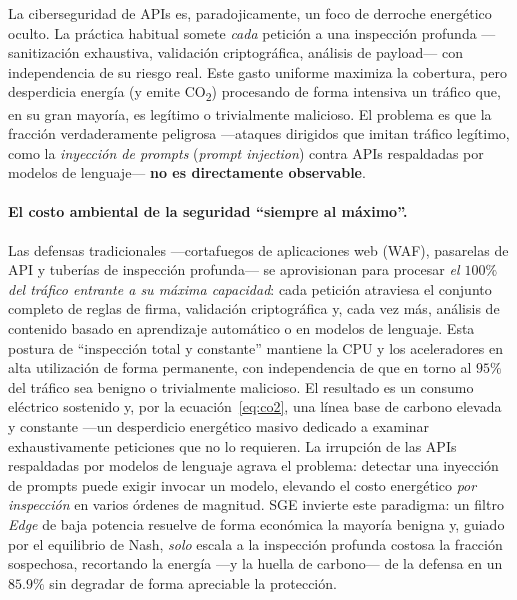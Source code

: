 \documentclass[10pt,twocolumn]{article}
\begin{document}
La ciberseguridad de APIs es, paradojicamente, un foco de derroche energ\'etico
oculto. La pr\'actica habitual somete \emph{cada} petici\'on a una inspecci\'on
profunda ---sanitizaci\'on exhaustiva, validaci\'on criptogr\'afica, an\'alisis de
payload--- con independencia de su riesgo real. Este gasto uniforme maximiza la
cobertura, pero desperdicia energ\'ia (y emite CO\textsubscript{2}) procesando de
forma intensiva un tr\'afico que, en su gran mayor\'ia, es leg\'itimo o trivialmente
malicioso. El problema es que la fracci\'on verdaderamente peligrosa ---ataques
dirigidos que imitan tr\'afico leg\'itimo, como la \emph{inyecci\'on de prompts}
(\emph{prompt injection}) contra APIs respaldadas por modelos de lenguaje--- \textbf{no
es directamente observable}.

\paragraph{El costo ambiental de la seguridad ``siempre al m\'aximo''.} Las defensas
tradicionales ---cortafuegos de aplicaciones web (WAF), pasarelas de API y tuber\'ias
de inspecci\'on profunda--- se aprovisionan para procesar \emph{el $100\%$ del
tr\'afico entrante a su m\'axima capacidad}: cada petici\'on atraviesa el conjunto
completo de reglas de firma, validaci\'on criptogr\'afica y, cada vez m\'as, an\'alisis
de contenido basado en aprendizaje autom\'atico o en modelos de lenguaje. Esta postura
de ``inspecci\'on total y constante'' mantiene la CPU y los aceleradores en alta
utilizaci\'on de forma permanente, con independencia de que en torno al $95\%$ del
tr\'afico sea benigno o trivialmente malicioso. El resultado es un consumo el\'ectrico
sostenido y, por la ecuaci\'on~\eqref{eq:co2}, una l\'inea base de carbono elevada y
constante ---un desperdicio energ\'etico masivo dedicado a examinar exhaustivamente
peticiones que no lo requieren. La irrupci\'on de las APIs respaldadas por modelos de
lenguaje agrava el problema: detectar una inyecci\'on de prompts puede exigir invocar
un modelo, elevando el costo energ\'etico \emph{por inspecci\'on} en varios \'ordenes
de magnitud. SGE invierte este paradigma: un filtro \emph{Edge} de baja potencia
resuelve de forma econ\'omica la mayor\'ia benigna y, guiado por el equilibrio de Nash,
\emph{solo} escala a la inspecci\'on profunda costosa la fracci\'on sospechosa,
recortando la energ\'ia ---y la huella de carbono--- de la defensa en un $85.9\%$ sin
degradar de forma apreciable la protecci\'on.
\end{document}
